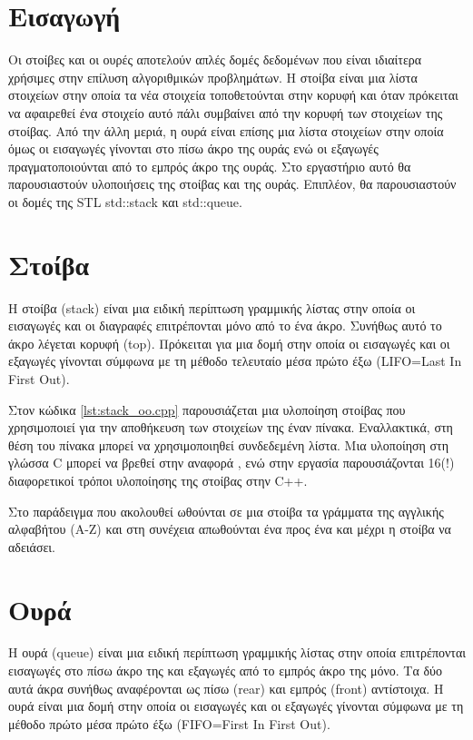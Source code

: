 \section{Εισαγωγή}
Οι στοίβες και οι ουρές αποτελούν απλές δομές δεδομένων που είναι ιδιαίτερα χρήσιμες στην επίλυση αλγοριθμικών προβλημάτων. Η στοίβα είναι μια λίστα στοιχείων στην οποία τα νέα στοιχεία τοποθετούνται στην κορυφή και όταν πρόκειται να αφαιρεθεί ένα στοιχείο αυτό πάλι συμβαίνει από την κορυφή των στοιχείων της στοίβας. Από την άλλη μεριά, η ουρά είναι επίσης μια λίστα στοιχείων στην οποία όμως οι εισαγωγές γίνονται στο πίσω άκρο της ουράς ενώ οι εξαγωγές πραγματοποιούνται από το εμπρός άκρο της ουράς. Στο εργαστήριο αυτό θα παρουσιαστούν υλοποιήσεις της στοίβας και της ουράς. Επιπλέον, θα παρουσιαστούν οι δομές της STL std::stack και std::queue.

\section{Στοίβα}
Η στοίβα (stack) είναι μια ειδική περίπτωση γραμμικής λίστας στην οποία οι εισαγωγές και οι διαγραφές επιτρέπονται μόνο από το ένα άκρο. Συνήθως αυτό το άκρο λέγεται κορυφή (top). Πρόκειται για μια δομή στην οποία οι εισαγωγές και οι εξαγωγές γίνονται σύμφωνα με τη μέθοδο τελευταίο μέσα πρώτο έξω (LIFO=Last In First Out).

Στον κώδικα \ref{lst:stack_oo.cpp} παρουσιάζεται μια υλοποίηση στοίβας που χρησιμοποιεί για την αποθήκευση των στοιχείων της έναν πίνακα. Εναλλακτικά, στη θέση του πίνακα μπορεί να χρησιμοποιηθεί συνδεδεμένη λίστα. Μια υλοποίηση στη γλώσσα C μπορεί να βρεθεί στην αναφορά \cite{tcc_stack_linked_list}, ενώ στην εργασία \cite{stroustrup_stack} παρουσιάζονται 16(!) διαφορετικοί τρόποι υλοποίησης της στοίβας στην C++. 

Στο παράδειγμα που ακολουθεί ωθούνται σε μια στοίβα τα γράμματα της αγγλικής αλφαβήτου (Α-Ζ) και στη συνέχεια απωθούνται ένα προς ένα και μέχρι η στοίβα να αδειάσει.




\section{Ουρά}
Η ουρά (queue) είναι μια ειδική περίπτωση γραμμικής λίστας στην οποία επιτρέπονται εισαγωγές στο πίσω άκρο της και εξαγωγές από το εμπρός άκρο της μόνο. Τα δύο αυτά άκρα συνήθως αναφέρονται ως πίσω (rear) και εμπρός (front) αντίστοιχα. Η ουρά είναι μια δομή στην οποία οι εισαγωγές και οι εξαγωγές γίνονται σύμφωνα με τη μέθοδο πρώτο μέσα πρώτο έξω (FIFO=First In First Out).

